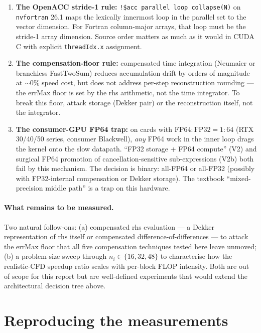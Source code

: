 \documentclass[11pt,a4paper]{article}
\begin{document}
\begin{enumerate}
  \item \textbf{The OpenACC stride-1 rule:} \texttt{!\$acc parallel
    loop collapse(N)} on \texttt{nvfortran} 26.1 maps the
    lexically innermost loop in the parallel set to the
    vector dimension. For Fortran column-major arrays, that loop
    must be the stride-1 array dimension. Source order matters as
    much as it would in CUDA C with explicit
    \texttt{threadIdx.x} assignment.
  \item \textbf{The compensation-floor rule:} compensated time
    integration (Neumaier or branchless FastTwoSum) reduces
    accumulation drift by orders of magnitude at \(\sim\!0\%\) speed
    cost, but does not address per-step reconstruction rounding ---
    the \(\mathrm{errMax}\) floor is set by the rhs arithmetic, not
    the time integrator. To break this floor, attack storage
    (Dekker pair) or the reconstruction itself, not the integrator.
  \item \textbf{The consumer-GPU FP64 trap:} on cards with
    \(\mathrm{FP64{:}FP32} = 1{:}64\) (RTX 30/40/50 series, consumer
    Blackwell), \emph{any} FP64 work in the inner loop drags the kernel
    onto the slow datapath. ``FP32 storage + FP64 compute'' (V2) and
    surgical FP64 promotion of cancellation-sensitive sub-expressions
    (V2b) both fail by this mechanism. The decision is binary:
    all-FP64 or all-FP32 (possibly with FP32-internal compensation
    or Dekker storage). The textbook ``mixed-precision middle path''
    is a trap on this hardware.
\end{enumerate}

\paragraph{What remains to be measured.}  Two natural follow-ons:
(a) compensated rhs evaluation --- a Dekker representation of
\(\mathrm{rhs}\) itself or compensated difference-of-differences ---
to attack the \(\mathrm{errMax}\) floor that all five compensation
techniques tested here leave unmoved; (b) a problem-size sweep
through \(n_i \in \{16, 32, 48\}\) to characterise how the
realistic-CFD speedup ratio scales with per-block FLOP intensity.
Both are out of scope for this report but are well-defined experiments
that would extend the architectural decision tree above.

\appendix

\section{Reproducing the measurements}
\label{app:repro}
\end{document}
